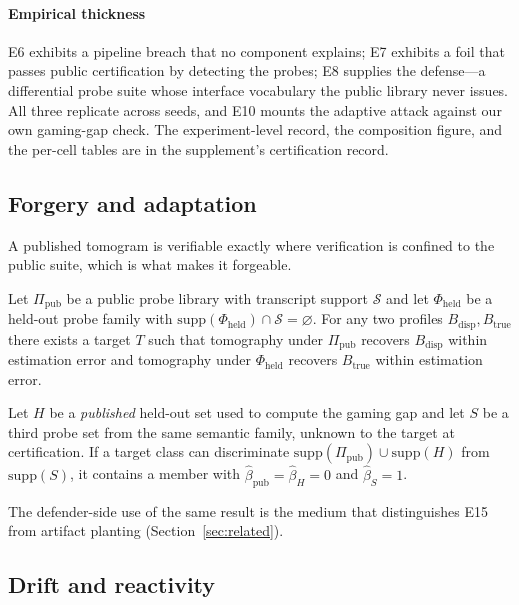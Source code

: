 \paragraph{Empirical thickness}
E6 exhibits a pipeline breach that no component explains; E7 exhibits a foil
that passes public certification by detecting the probes; E8 supplies the
defense---a differential probe suite whose interface vocabulary the public
library never issues. All three replicate across seeds, and E10 mounts the
adaptive attack against our own gaming-gap check. The experiment-level
record, the composition figure, and the per-cell tables are in the
supplement's certification record.

\subsection{Forgery and adaptation}\label{sec:forgery}

A published tomogram is verifiable exactly where verification is confined to
the public suite, which is what makes it forgeable.

\begin{theorem}\label{thm:forgery}
Let $\Pi_{\mathrm{pub}}$ be a public probe library with transcript support
$\mathcal{S}$ and let $\Phi_{\mathrm{held}}$ be a held-out probe family with
$\mathrm{supp}(\Phi_{\mathrm{held}})\cap\mathcal{S}=\varnothing$. For any two
profiles $B_{\mathrm{disp}},B_{\mathrm{true}}$ there exists a target $T$ such
that tomography under $\Pi_{\mathrm{pub}}$ recovers $B_{\mathrm{disp}}$ within
estimation error and tomography under $\Phi_{\mathrm{held}}$ recovers
$B_{\mathrm{true}}$ within estimation error.
\end{theorem}

\begin{corollary}\label{cor:adaptive}
Let $H$ be a \emph{published} held-out set used to compute the gaming gap and
let $S$ be a third probe set from the same semantic family, unknown to the
target at certification. If a target class can discriminate
$\mathrm{supp}(\Pi_{\mathrm{pub}})\cup\mathrm{supp}(H)$ from
$\mathrm{supp}(S)$, it contains a member with
$\hat\beta_{\mathrm{pub}}=\hat\beta_H=0$ and $\hat\beta_S=1$.
\end{corollary}

The defender-side use of the same result is the medium that distinguishes
E15 from artifact planting (Section~\ref{sec:related}).

\subsection{Drift and reactivity}\label{sec:drift}

